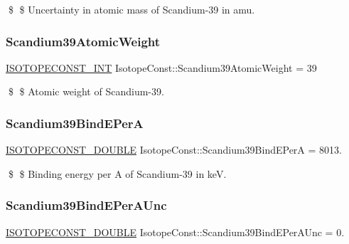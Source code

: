 \$ \$ Uncertainty in atomic mass of Scandium-\/39 in amu. \mbox{\label{group___isotope_const-_scandium-_sc39_ga1a14739dab5cda751009252ebcb75053}} 
\subsubsection{\texorpdfstring{Scandium39\+Atomic\+Weight}{Scandium39AtomicWeight}}
{\footnotesize\ttfamily \mbox{\hyperlink{group___isotope_const-_macros_ga5f18360b3e99483a35c32d789e62621c}{I\+S\+O\+T\+O\+P\+E\+C\+O\+N\+S\+T\+\_\+\+I\+NT}} Isotope\+Const\+::\+Scandium39\+Atomic\+Weight = 39}

\$ \$ Atomic weight of Scandium-\/39. \mbox{\label{group___isotope_const-_scandium-_sc39_ga9102232e5181f4a1d7bee38b4c1cfabf}} 
\subsubsection{\texorpdfstring{Scandium39\+Bind\+E\+PerA}{Scandium39BindEPerA}}
{\footnotesize\ttfamily \mbox{\hyperlink{group___isotope_const-_macros_ga8f45a7272ce02c0b4c65c44636ed719a}{I\+S\+O\+T\+O\+P\+E\+C\+O\+N\+S\+T\+\_\+\+D\+O\+U\+B\+LE}} Isotope\+Const\+::\+Scandium39\+Bind\+E\+PerA = 8013.}

\$ \$ Binding energy per A of Scandium-\/39 in keV. \mbox{\label{group___isotope_const-_scandium-_sc39_ga1effdbc801a7780f5ec6aa1ef79c85b4}} 
\subsubsection{\texorpdfstring{Scandium39\+Bind\+E\+Per\+A\+Unc}{Scandium39BindEPerAUnc}}
{\footnotesize\ttfamily \mbox{\hyperlink{group___isotope_const-_macros_ga8f45a7272ce02c0b4c65c44636ed719a}{I\+S\+O\+T\+O\+P\+E\+C\+O\+N\+S\+T\+\_\+\+D\+O\+U\+B\+LE}} Isotope\+Const\+::\+Scandium39\+Bind\+E\+Per\+A\+Unc = 0.}

